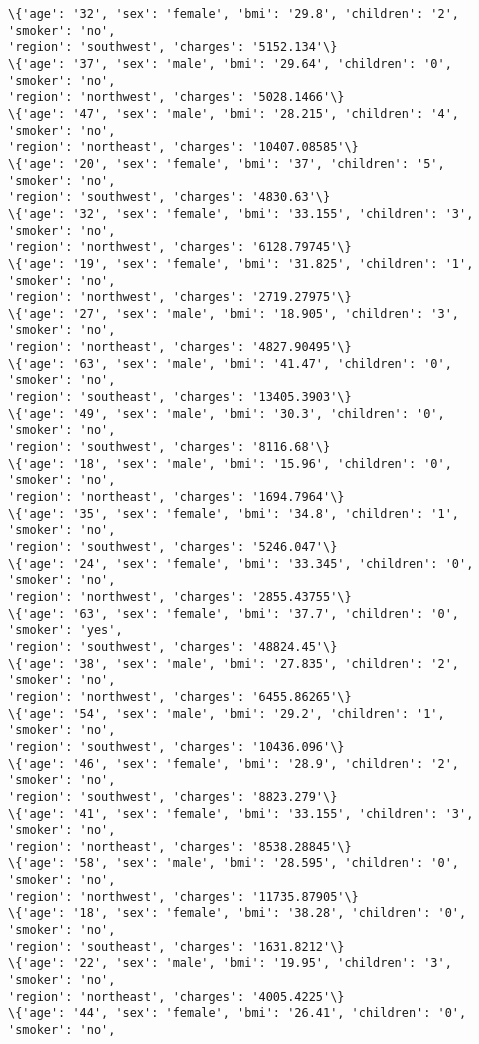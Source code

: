 \documentclass[11pt]{article}
\begin{document}
\begin{Verbatim}[commandchars=\\\{\}]
\{'age': '32', 'sex': 'female', 'bmi': '29.8', 'children': '2', 'smoker': 'no',
'region': 'southwest', 'charges': '5152.134'\}
\{'age': '37', 'sex': 'male', 'bmi': '29.64', 'children': '0', 'smoker': 'no',
'region': 'northwest', 'charges': '5028.1466'\}
\{'age': '47', 'sex': 'male', 'bmi': '28.215', 'children': '4', 'smoker': 'no',
'region': 'northeast', 'charges': '10407.08585'\}
\{'age': '20', 'sex': 'female', 'bmi': '37', 'children': '5', 'smoker': 'no',
'region': 'southwest', 'charges': '4830.63'\}
\{'age': '32', 'sex': 'female', 'bmi': '33.155', 'children': '3', 'smoker': 'no',
'region': 'northwest', 'charges': '6128.79745'\}
\{'age': '19', 'sex': 'female', 'bmi': '31.825', 'children': '1', 'smoker': 'no',
'region': 'northwest', 'charges': '2719.27975'\}
\{'age': '27', 'sex': 'male', 'bmi': '18.905', 'children': '3', 'smoker': 'no',
'region': 'northeast', 'charges': '4827.90495'\}
\{'age': '63', 'sex': 'male', 'bmi': '41.47', 'children': '0', 'smoker': 'no',
'region': 'southeast', 'charges': '13405.3903'\}
\{'age': '49', 'sex': 'male', 'bmi': '30.3', 'children': '0', 'smoker': 'no',
'region': 'southwest', 'charges': '8116.68'\}
\{'age': '18', 'sex': 'male', 'bmi': '15.96', 'children': '0', 'smoker': 'no',
'region': 'northeast', 'charges': '1694.7964'\}
\{'age': '35', 'sex': 'female', 'bmi': '34.8', 'children': '1', 'smoker': 'no',
'region': 'southwest', 'charges': '5246.047'\}
\{'age': '24', 'sex': 'female', 'bmi': '33.345', 'children': '0', 'smoker': 'no',
'region': 'northwest', 'charges': '2855.43755'\}
\{'age': '63', 'sex': 'female', 'bmi': '37.7', 'children': '0', 'smoker': 'yes',
'region': 'southwest', 'charges': '48824.45'\}
\{'age': '38', 'sex': 'male', 'bmi': '27.835', 'children': '2', 'smoker': 'no',
'region': 'northwest', 'charges': '6455.86265'\}
\{'age': '54', 'sex': 'male', 'bmi': '29.2', 'children': '1', 'smoker': 'no',
'region': 'southwest', 'charges': '10436.096'\}
\{'age': '46', 'sex': 'female', 'bmi': '28.9', 'children': '2', 'smoker': 'no',
'region': 'southwest', 'charges': '8823.279'\}
\{'age': '41', 'sex': 'female', 'bmi': '33.155', 'children': '3', 'smoker': 'no',
'region': 'northeast', 'charges': '8538.28845'\}
\{'age': '58', 'sex': 'male', 'bmi': '28.595', 'children': '0', 'smoker': 'no',
'region': 'northwest', 'charges': '11735.87905'\}
\{'age': '18', 'sex': 'female', 'bmi': '38.28', 'children': '0', 'smoker': 'no',
'region': 'southeast', 'charges': '1631.8212'\}
\{'age': '22', 'sex': 'male', 'bmi': '19.95', 'children': '3', 'smoker': 'no',
'region': 'northeast', 'charges': '4005.4225'\}
\{'age': '44', 'sex': 'female', 'bmi': '26.41', 'children': '0', 'smoker': 'no',

\end{Verbatim}
\end{document}
